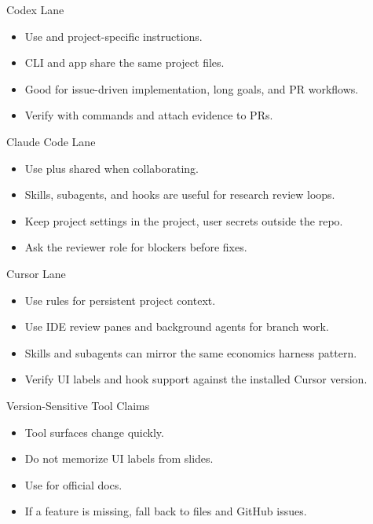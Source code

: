 \begin{frame}{Codex Lane}
  \begin{itemize}
    \item Use  and project-specific instructions.
    \item CLI and app share the same project files.
    \item Good for issue-driven implementation, long goals, and PR workflows.
    \item Verify with commands and attach evidence to PRs.
  \end{itemize}
\end{frame}

\begin{frame}{Claude Code Lane}
  \begin{itemize}
    \item Use  plus shared  when collaborating.
    \item Skills, subagents, and hooks are useful for research review loops.
    \item Keep project settings in the project, user secrets outside the repo.
    \item Ask the reviewer role for blockers before fixes.
  \end{itemize}
\end{frame}

\begin{frame}{Cursor Lane}
  \begin{itemize}
    \item Use rules for persistent project context.
    \item Use IDE review panes and background agents for branch work.
    \item Skills and subagents can mirror the same economics harness pattern.
    \item Verify UI labels and hook support against the installed Cursor version.
  \end{itemize}
\end{frame}

\begin{frame}{Version-Sensitive Tool Claims}
  \begin{itemize}
    \item Tool surfaces change quickly.
    \item Do not memorize UI labels from slides.
    \item Use  for official docs.
    \item If a feature is missing, fall back to files and GitHub issues.
  \end{itemize}
\end{frame}

